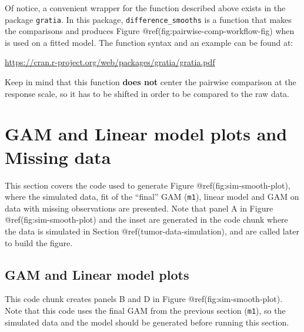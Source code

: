 \documentclass[Royal,times,sagev]{sagej}
\begin{document}
Of notice, a convenient wrapper for the function described above exists
in the package \texttt{gratia}. In this package,
\texttt{difference\_smooths} is a function that makes the comparisons
and produces Figure @ref(fig:pairwise-comp-workflow-fig) when is used on
a fitted model. The function syntax and an example can be found at:

\url{https://cran.r-project.org/web/packages/gratia/gratia.pdf}

Keep in mind that this function \textbf{does not} center the pairwise
comparison at the response scale, so it has to be shifted in order to be
compared to the raw data.

\hypertarget{gam-and-linear-model-plots-and-missing-data}{%
\section{GAM and Linear model plots and Missing
data}\label{gam-and-linear-model-plots-and-missing-data}}

This section covers the code used to generate Figure
@ref(fig:sim-smooth-plot), where the simulated data, fit of the
``final'' GAM (\texttt{m1}), linear model and GAM on data with missing
observations are presented. Note that panel A in Figure
@ref(fig:sim-smooth-plot) and the inset are generated in the code chunk
where the data is simulated in Section @ref(tumor-data-simulation), and
are called later to build the figure.

\hypertarget{gam-and-linear-model-plots}{%
\subsection{GAM and Linear model
plots}\label{gam-and-linear-model-plots}}

This code chunk creates panels B and D in Figure
@ref(fig:sim-smooth-plot). Note that this code uses the final GAM from
the previous section (\texttt{m1}), so the simulated data and the model
should be generated before running this section.
\end{document}

